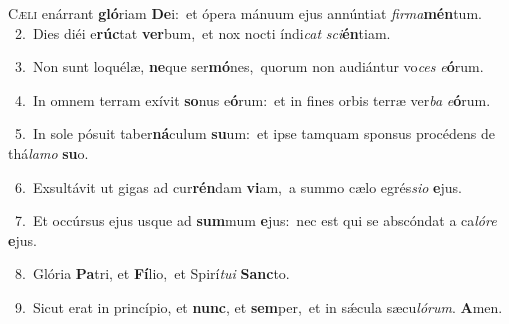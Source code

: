 \lettrine{\initial\textcolor{\initialcolor}{C}}{æli} enárrant \textbf{gló}\-riam \textbf{De}\-i:~\star et ópera mánuum ejus annúntiat \textit{fir}\-\textit{ma}\textbf{mén}tum.\\
{\numbfont\textcolor{\numbcolor}{~2.}}~Dies diéi e\-\textbf{rúc}\-tat \textbf{ver}\-bum,~\star et nox nocti índi\textit{cat} \textit{sci}\-\textbf{én}tiam.\par
{\numbfont\textcolor{\numbcolor}{~3.}}~Non sunt loquélæ, \textbf{ne}\-que ser\-\textbf{mó}\-nes,~\star quorum non audiántur vo\textit{ces} \textit{e}\-\textbf{ó}rum.\par
{\numbfont\textcolor{\numbcolor}{~4.}}~In omnem terram exívit \textbf{so}\-nus e\-\textbf{ó}\-rum:~\star et in fines orbis terræ ver\textit{ba} \textit{e}\-\textbf{ó}rum.\par
{\numbfont\textcolor{\numbcolor}{~5.}}~In sole pósuit taber\-\textbf{ná}\-culum \textbf{su}\-um:~\star et ipse tamquam sponsus procédens de thá\-\textit{la}\-\textit{mo} \textbf{su}\-o.\par
{\numbfont\textcolor{\numbcolor}{~6.}}~Exsultávit ut gigas ad cur\-\textbf{rén}\-dam \textbf{vi}\-am,~\star a summo cælo egrés\-\textit{si}\-\textit{o} \textbf{e}\-jus.\par
{\numbfont\textcolor{\numbcolor}{~7.}}~Et occúrsus ejus usque ad \textbf{sum}\-mum \textbf{e}\-jus:~\star nec est qui se abscóndat a ca\-\textit{ló}\-\textit{re} \textbf{e}\-jus.\par
{\numbfont\textcolor{\numbcolor}{~8.}}~Glória \textbf{Pa}\-tri, et \textbf{Fí}\-lio,~\star et Spirí\-\textit{tu}\-\textit{i} \textbf{Sanc}\-to.\par
{\numbfont\textcolor{\numbcolor}{~9.}}~Sicut erat in princípio, et \textbf{nunc}\-, et \textbf{sem}\-per,~\star et in sǽcula sæcu\-\textit{ló}\-\textit{rum}. \textbf{A}\-men.\par
